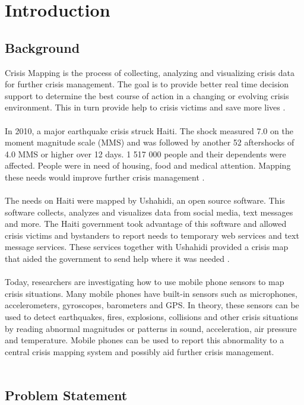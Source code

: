 \chapter{Introduction}

\section{Background}

Crisis Mapping is the process of collecting, analyzing and visualizing crisis data for further crisis management. The goal is to provide better real time decision support to determine the best course of action in a changing or evolving crisis environment. This in turn provide help to crisis victims and save more lives \cite{irevol}.
\\\\
In 2010, a major earthquake crisis struck Haiti. The shock measured 7.0 on the moment magnitude scale (MMS) and was followed by another 52 aftershocks of 4.0 MMS or higher over 12 days. 1 517 000 people and their dependents were affected. People were in need of housing, food and medical attention. Mapping these needs would improve further crisis management \cite{usha}.
\\\\
The needs on Haiti were mapped by Ushahidi\cite{usha}, an open source software. This software collects, analyzes and visualizes data from social media, text messages and more. The Haiti government took advantage of this software and allowed crisis victims and bystanders to report needs to temporary web services and text message services. These services together with Ushahidi provided a crisis map that aided the government to send help where it was needed \cite{usha}.
\\\\
Today, researchers are investigating how to use mobile phone sensors to map crisis situations. Many mobile phones have built-in sensors such as microphones, accelerometers, gyroscopes, barometers and GPS. In theory, these sensors can be used to detect earthquakes, fires, explosions, collisions and other crisis situations by reading abnormal magnitudes or patterns in sound, acceleration, air pressure and temperature. Mobile phones can be used to report this abnormality to a central crisis mapping system and possibly aid further crisis management.
\\\\
\section{Problem Statement}


